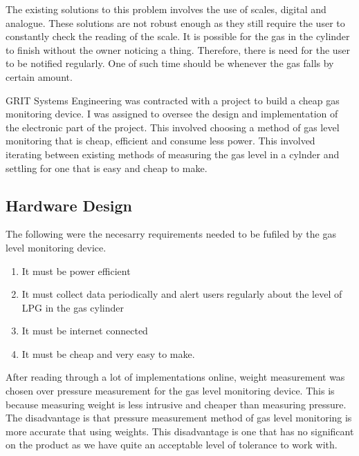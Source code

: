 The existing solutions to this problem involves the use of scales, digital and analogue. These solutions are not robust enough as they still require the user to constantly check the reading of the scale. It is possible for the gas in the cylinder to finish without the owner noticing a thing. Therefore, there is need for the user to be notified regularly. One of such time should be whenever the gas falls by certain amount. 

GRIT Systems Engineering was contracted with a project to build a cheap gas monitoring device. I was assigned to oversee the design and implementation of the electronic part of the project. This involved choosing a method of gas level monitoring that is cheap, efficient and consume less power. This involved iterating between existing methods of measuring the gas level in a cylnder and settling for one that is easy and cheap to make.


\subsection{Hardware Design}
The following were the necesarry requirements needed to be fufiled by the gas level monitoring device.
\begin{enumerate}
\item It must be power efficient
\item It must collect data periodically and alert users regularly about the level of LPG in the gas cylinder
\item It must be internet connected 
\item It must be cheap and very easy to make.
\end{enumerate}

After reading through a lot of implementations online, weight measurement was chosen over pressure measurement for the gas level monitoring device. This is because measuring weight is less intrusive and cheaper than measuring pressure. The disadvantage is that 
pressure measurement method of gas level monitoring is more accurate that using weights. This disadvantage is one that has no significant on the product as we have quite an acceptable level of tolerance to work with. 

